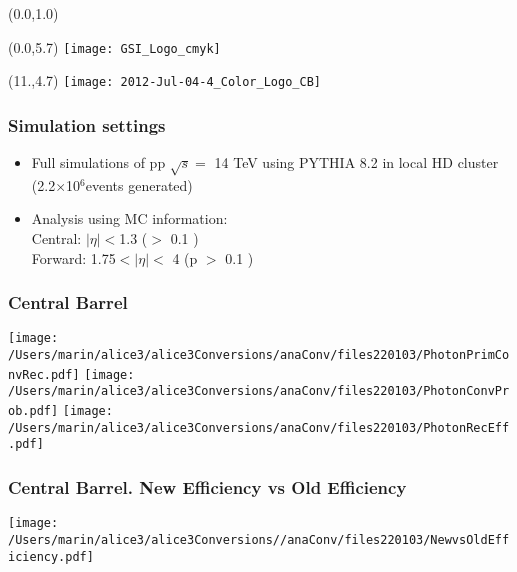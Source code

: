\documentclass[final,hyperref={pdfpagelabels=false},aspectratio=169,t]{beamer}
\date{\today} %
\title{\texorpdfstring{\LARGE Central and Forward rapidity. $\eta$ meson }}
\author[A.Marin]{Ana Marin}
\institute[GSI]{\small GSI, Darmstadt, Germany}
\begin{document}
\begin{frame}

  \begin{textblock}{14}(0.0,1.0)
    \titlepage
  \end{textblock}
  

 \begin{textblock}{12}(0.0,5.7)
     \texttt{[image: GSI\_Logo\_cmyk]}
\end{textblock}

  \begin{textblock}{12}(11.,4.7)
    \texttt{[image: 2012-Jul-04-4\_Color\_Logo\_CB]}
  \end{textblock}

\end{frame}

\begin{frame}
\frametitle{Simulation settings}

\begin{itemize}
\item  Full simulations of pp $\sqrt{s} =$ 14 TeV using PYTHIA 8.2  in local HD cluster  (2.2$\times$10$^6$events generated) 
\item  Analysis using MC information: \\
 Central: $|\eta| < $1.3 (\pT $ > $ 0.1 \GeVc) \\
 Forward: 1.75$ < |\eta| < $ 4 (p $ > $ 0.1 \GeVc)   
\end{itemize}
\end{frame}

\begin{frame}
\frametitle{Central Barrel} 
\vspace{1cm}
\texttt{[image: /Users/marin/alice3/alice3Conversions/anaConv/files220103/PhotonPrimConvRec.pdf]}
\texttt{[image: /Users/marin/alice3/alice3Conversions/anaConv/files220103/PhotonConvProb.pdf]}
\texttt{[image: /Users/marin/alice3/alice3Conversions/anaConv/files220103/PhotonRecEff.pdf]}
\end{frame}


\begin{frame}
\frametitle{Central Barrel. New Efficiency vs Old Efficiency}

\texttt{[image: /Users/marin/alice3/alice3Conversions//anaConv/files220103/NewvsOldEfficiency.pdf]}

\end{frame}
\end{document}
